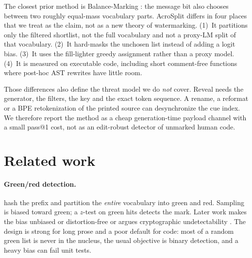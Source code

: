 \documentclass[11pt]{article}
\begin{document}
The closest prior method is Balance-Marking \citep{wang2024balancemarking}: the message bit also chooses between two roughly equal-mass vocabulary parts.
AcroSplit differs in four places that we treat as the claim, not as a new theory of watermarking.
(1)~It partitions only the filtered shortlist, not the full vocabulary and not a proxy-LM split of that vocabulary.
(2)~It hard-masks the unchosen list instead of adding a logit bias.
(3)~It uses the fill-lighter greedy assignment rather than a proxy model.
(4)~It is measured on executable code, including short comment-free functions where post-hoc AST rewrites have little room.

Those differences also define the threat model we do \emph{not} cover.
Reveal needs the generator, the filters, the key and the exact token sequence.
A rename, a reformat or a BPE retokenization of the printed source can desynchronize the cue index.
We therefore report the method as a cheap generation-time payload channel with a small pass@1 cost, not as an edit-robust detector of unmarked human code.

\section{Related work}
\label{sec:related}

\paragraph{Green/red detection.}
\citet{kirchenbauer-etal-2023-watermark} hash the prefix and partition the \emph{entire} vocabulary into green and red.
Sampling is biased toward green; a $z$-test on green hits detects the mark.
Later work makes the bias unbiased or distortion-free \citep{zhao2023provable,kuditipudi2024robust} or argues cryptographic undetectability \citep{christ2024undetectable}.
The design is strong for long prose and a poor default for code: most of a random green list is never in the nucleus, the usual objective is binary detection, and a heavy bias can fail unit tests.
\end{document}
